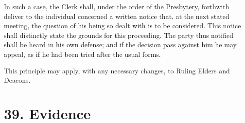 \documentclass[
]{book}
\begin{document}
\begin{enumerate}
  In such a case, the Clerk shall, under the order of the Presbytery, forthwith deliver to the individual concerned a written notice that, at the next stated meeting, the question of his being so dealt with is to be considered. This notice shall distinctly state the grounds for this proceeding. The party thus notified shall be heard in his own defense; and if the decision pass against him he may appeal, as if he had been tried after the usual forms.

  This principle may apply, with any necessary changes, to Ruling Elders and Deacons.
\end{enumerate}

\hypertarget{evidence}{%
\section*{39. Evidence}\label{evidence}}

\protect\hypertarget{chapter-slug-39-evidence}{\href{}{}}
\end{document}
